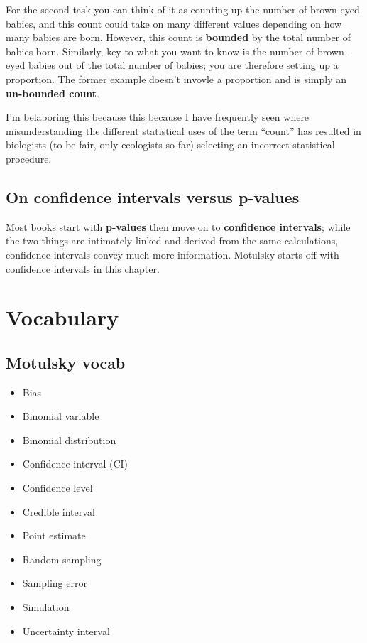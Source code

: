 \documentclass[]{book}
\providecommand{\tightlist}{%
  \setlength{\itemsep}{0pt}\setlength{\parskip}{0pt}}
\theoremstyle{definition}
\theoremstyle{definition}
\theoremstyle{definition}
\theoremstyle{remark}
\begin{document}
For the second task you can think of it as counting up the number of
brown-eyed babies, and this count could take on many different values
depending on how many babies are born. However, this count is
\textbf{bounded} by the total number of babies born. Similarly, key to
what you want to know is the number of brown-eyed babies out of the
total number of babies; you are therefore setting up a proportion. The
former example doesn't invovle a proportion and is simply an
\textbf{un-bounded count}.

I'm belaboring this because this because I have frequently seen where
misunderstanding the different statistical uses of the term ``count''
has resulted in biologists (to be fair, only ecologists so far)
selecting an incorrect statistical procedure.

\subsection*{On confidence intervals versus
p-values}\label{on-confidence-intervals-versus-p-values}

Most books start with \textbf{p-values} then move on to
\textbf{confidence intervals}; while the two things are intimately
linked and derived from the same calculations, confidence intervals
convey much more information. Motulsky starts off with confidence
intervals in this chapter.

\section*{Vocabulary}\label{vocabulary-3}

\subsection*{Motulsky vocab}\label{motulsky-vocab-3}

\begin{itemize}
\tightlist
\item
  Bias
\item
  Binomial variable
\item
  Binomial distribution
\item
  Confidence interval (CI)
\item
  Confidence level
\item
  Credible interval
\item
  Point estimate
\item
  Random sampling
\item
  Sampling error
\item
  Simulation
\item
  Uncertainty interval
\end{itemize}
\end{document}
